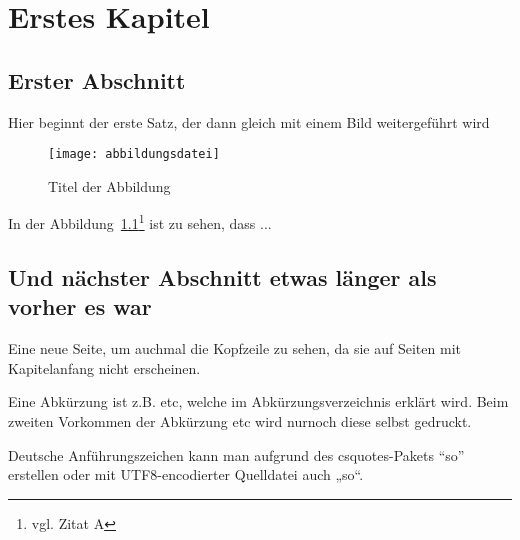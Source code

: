 \chapter{Erstes Kapitel}
\section{Erster Abschnitt}

Hier beginnt der erste Satz, der dann gleich mit einem Bild weitergeführt wird
\begin{figure}[htbp]
\centering
\texttt{[image: abbildungsdatei]} %
\caption{Titel der Abbildung} 
\label{fig:bild1}
\end{figure}

In der Abbildung~\ref{fig:bild1}\footnote{vgl. Zitat A\cite{referenzA}} %
ist zu sehen, dass ...

\newpage

\section{Und nächster Abschnitt etwas länger als vorher es war}
Eine neue Seite, um auchmal die Kopfzeile zu sehen, da sie auf Seiten mit Kapitelanfang nicht erscheinen. 

Eine Abkürzung ist z.B. \gls{etc}, welche im Abkürzungsverzeichnis erklärt wird. Beim zweiten Vorkommen der Abkürzung \gls{etc} wird nurnoch diese selbst gedruckt.

Deutsche Anführungszeichen kann man aufgrund des csquotes-Pakets \enquote{so} erstellen oder mit UTF8-encodierter Quelldatei auch „so“.
